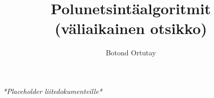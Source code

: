 \documentclass[language=finnish,version=final,mainfont=none,sharelatex=false]{utuftthesis}
\providecommand{\algorithmname}{Algoritmi}
\begin{document}
\title{Polunetsintäalgoritmit (väliaikainen otsikko)}
\author{Botond Ortutay}

\maketitle


\tableofcontents



\listofacronyms

\renewcommand{\algorithmname}{\listingscaption}


\begin{comment}
To better organize things, create a new tex file for each chapter
and input it below.

Avoid using the å, ä, ö or <space> characters in referred names and
underscores \_ in file names (may break hyperref).

Good luck!
\end{comment}









\printbibliography

\begin{comment}
Important! Create the appendix chapters with command \textbackslash appchapter\{some
name\} instead of \textbackslash chapter\{some name\} for the automagic
page counting to work!
\end{comment}



\textit{*Placeholder liitedokumenteille*}
\end{document}
